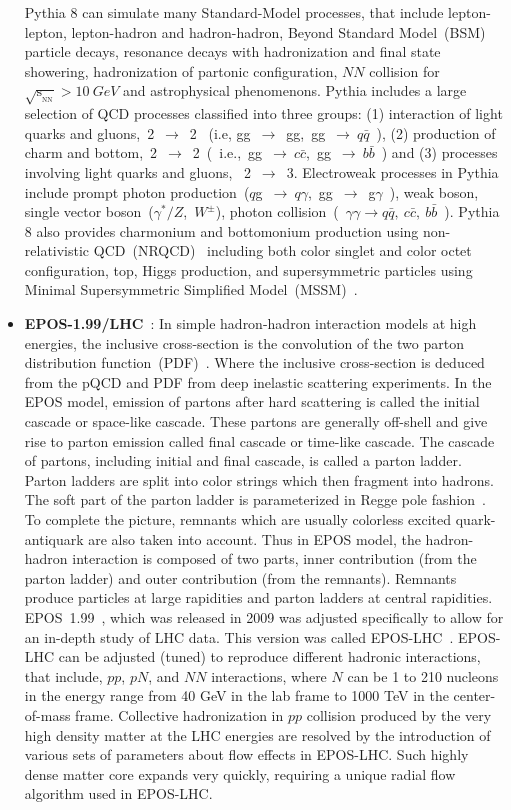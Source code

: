 \documentclass{article}
\newcommand{\sqrtsNN}{\mbox{$\sqrt{\mathrm{s}_{_{\mathrm{NN}}}}$}}
\begin{document}
\begin{itemize}
Pythia 8 can simulate many Standard-Model processes, that include lepton-lepton, lepton-hadron and hadron-hadron, Beyond Standard Model~(BSM) particle decays, resonance decays with hadronization and final state showering, hadronization of partonic configuration, $NN$ collision for $\sqrtsNN>10~GeV$ and astrophysical phenomenons. Pythia includes a large selection of QCD processes classified into three groups: (1) interaction of light quarks and gluons,~2~$\rightarrow$~2~ (i.e, gg~$\rightarrow$~gg,~gg~$\rightarrow~q\bar{q}$~), (2) production of charm and bottom,~2~$\rightarrow$~2~(~i.e.,~gg~$\rightarrow~c\bar{c}$,~gg~$\rightarrow~b\bar{b}$~) and (3) processes involving light quarks and gluons, ~2~$\rightarrow$~3. Electroweak processes in Pythia include prompt photon production~($q$g~$\rightarrow~q\gamma$,~gg~$\rightarrow$~g$\gamma$~), weak boson, single vector boson~($\gamma^{*}/Z$,~$W^{\pm}$), photon collision~(~$\gamma \gamma\rightarrow q\bar{q},~c\bar{c},~b\bar{b}$~). Pythia 8 also provides charmonium and bottomonium production using non-relativistic QCD~(NRQCD)~\cite{37} including both color singlet and color octet configuration, top, Higgs production, and supersymmetric particles using Minimal Supersymmetric Simplified Model~(MSSM)~\cite{38}. 


\item \textbf{EPOS-1.99/LHC}~\cite{39,40,41}: 
In simple hadron-hadron interaction models at high energies, the inclusive cross-section is the convolution of the two
parton distribution function~(PDF)~\cite{42}. Where the inclusive cross-section is deduced from the pQCD and PDF from deep inelastic scattering experiments. In the EPOS model, emission of partons after hard scattering is called the initial cascade or space-like cascade. These partons are generally off-shell and give rise to parton emission called final cascade or time-like cascade. The cascade of partons, including initial and final cascade, is called a parton ladder. Parton ladders are split into color strings which then fragment into hadrons. The soft part of the parton ladder is parameterized in Regge pole fashion~\cite{43}. To complete the picture, remnants which are usually colorless excited quark-antiquark are also taken into account. Thus in EPOS model, the hadron-hadron interaction is composed of two parts, inner contribution (from the parton ladder) and outer contribution (from the remnants). Remnants produce particles at large rapidities and parton ladders at central rapidities.\\
EPOS~1.99~\cite{41}, which was released in 2009 was adjusted specifically to allow for an in-depth study of LHC data. This version was called EPOS-LHC~\cite{40}. EPOS-LHC can be adjusted (tuned) to reproduce different hadronic interactions, that include, $pp$, $pN$, and $NN$ interactions, where $N$ can be 1 to 210 nucleons in the energy range from 40 GeV in the lab frame to 1000 TeV in the center-of-mass frame. Collective hadronization in $pp$ collision produced by the very high density matter at the LHC energies are resolved by the introduction of various sets of parameters about flow effects in EPOS-LHC. Such highly dense matter core expands very quickly, requiring a unique radial flow algorithm used in EPOS-LHC.  
\end{itemize}
\end{document}
